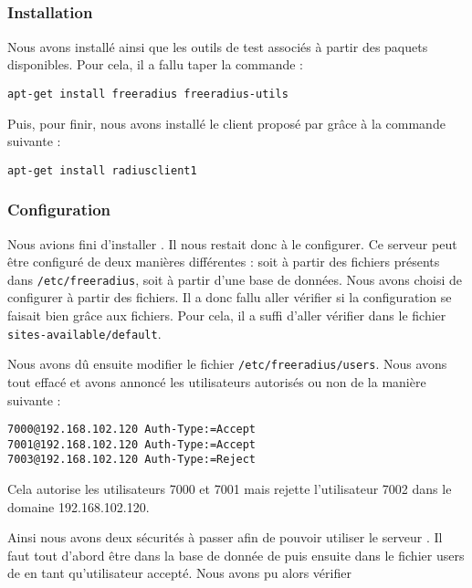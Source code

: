 \subsection{\frad}
\subsubsection{Installation}

Nous avons installé {\frad} ainsi que les outils de test associés à partir des paquets disponibles. Pour cela, il a fallu taper la commande :

\begin{verbatim}
apt-get install freeradius freeradius-utils
\end{verbatim}

Puis, pour finir, nous avons installé le client {\rad} proposé par {\frad} grâce à la commande suivante :

\begin{verbatim}
apt-get install radiusclient1
\end{verbatim}

\subsubsection{Configuration}
Nous avions fini d'installer {\frad}. Il nous restait donc à le configurer. Ce serveur {\rad} peut être configuré de deux manières différentes : soit à partir des fichiers présents dans \texttt{/etc/freeradius}, soit à partir d'une base de données. Nous avons choisi de configurer à partir des fichiers. Il a donc fallu aller vérifier si la configuration se faisait bien grâce aux fichiers. Pour cela, il a suffi d'aller vérifier dans le fichier \texttt{sites-available/default}.


Nous avons dû ensuite modifier le fichier \texttt{/etc/freeradius/users}. Nous avons tout effacé et avons annoncé les utilisateurs autorisés ou non de la manière suivante :

\begin{verbatim}
7000@192.168.102.120 Auth-Type:=Accept
7001@192.168.102.120 Auth-Type:=Accept
7003@192.168.102.120 Auth-Type:=Reject
\end{verbatim}

Cela autorise les utilisateurs 7000 et 7001 mais rejette l'utilisateur 7002 dans le domaine 192.168.102.120.

Ainsi nous avons deux sécurités à passer afin de pouvoir utiliser le serveur {\kam}. Il faut tout d'abord être dans la base de donnée de {\kam} puis ensuite dans le fichier users de {\frad} en tant qu'utilisateur accepté. Nous avons pu alors vérifier 

